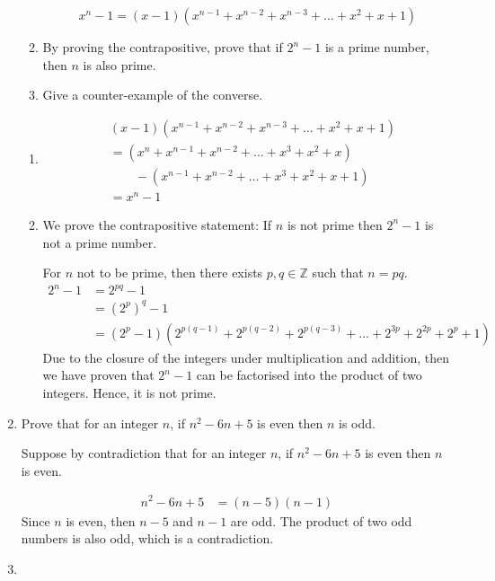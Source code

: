 \documentclass[11pt, a4paper, oneside]{exam}
\theoremstyle{definition}\newtheorem{define}{Definition}[section]
\theoremstyle{remark}\newtheorem{remark}{Remark}
\theoremstyle{definition}\newtheorem{example}{Example}[subsection]
\theoremstyle{definition}\newtheorem{notation}{Notation}[section]
\theoremstyle{definition}\newtheorem{theorem}{Theorem}[section]
\theoremstyle{definition}\newtheorem{corollary}{Corollary}[section]
\begin{document}
\begin{enumerate}
\begin{enumerate}
\[x^n -1 = (x-1)(x^{n-1} + x^{n-2} + x^{n-3} + \ldots + x^2 + x + 1) \]

\item By proving the contrapositive, prove that if $2^n - 1$ is a prime number, then $n$ is also prime.
\item Give a counter-example of the converse.

\end{enumerate}

\begin{enumerate}
\item 
\begin{align*}
& (x-1)(x^{n-1} + x^{n-2} + x^{n-3} + \ldots + x^2 + x + 1)\\
& = (x^n + x^{n-1} + x^{n-2} + \ldots + x^3 + x^2 + x)\\
& \quad\quad - (x^{n-1} + x^{n-2} + \ldots + x^3+ x^2 + x + 1)\\
& = x^n - 1
\end{align*}
\item We prove the contrapositive statement: If $n$ is not prime then $2^n-1$ is not a prime number.

For $n$ not to be prime, then there exists $p,q \in\mathbb{Z}$ such that $n = pq$.
\begin{align*}
2^n - 1 & = 2^{pq} - 1\\
& = (2^p)^q - 1 \\
& = (2^p - 1)(2^{p(q-1)} + 2^{p(q-2)} + 2^{p(q-3)} + \ldots + 2^{3p} +  2^{2p} + 2^p + 1)
\end{align*}
Due to the closure of the integers under multiplication and addition, then we have proven that $2^n - 1$ can be factorised into the product of two integers. Hence, it is not prime.

\end{enumerate}






\item Prove that for an integer $n$, if $n^2 - 6n + 5$ is even then $n$ is odd.


Suppose by contradiction that for an integer $n$, if $n^2 - 6n +5$ is even then $n$ is even.

\begin{align*}
n^2 - 6n + 5 & = (n-5)(n-1)
\end{align*}
Since $n$ is even, then $n-5$ and $n-1$ are odd. The product of two odd numbers is also odd, which is a contradiction.

\item


\end{enumerate}
\end{document}
